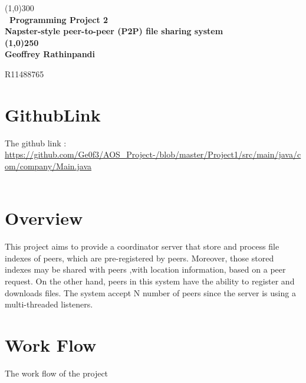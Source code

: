 \documentclass{article}
\begin{document}
\begin{titlepage}
	\begin{center}
	\line(1,0){300}\\
	[0.25in]
	\huge\bfseries\ Programming Project 2 \\Napster-style peer-to-peer (P2P) file sharing system \\
	
	
	\line(1,0){250}\\
	\bfseries {Geoffrey Rathinpandi}\\
	\end{center}
	
	

	\begin{flushright}
	\textsc{R11488765}\\
	
	
	\end{flushright}
	\tableofcontents
\end{titlepage}
\section{GithubLink}
The github link :  \url{https://github.com/Ge0f3/AOS_Project-/blob/master/Project1/src/main/java/com/company/Main.java} \\ \\

\section{Overview}

This project aims to provide a coordinator server that store and process file
indexes of peers, which are pre-registered by peers. Moreover, those stored indexes may be shared with peers ,with location information, based on a peer request. On the other hand, peers in this system have the ability to register and downloads files. The system accept N number of peers since the server is using a multi-threaded listeners.


\section{Work Flow}

The work flow of the project  \\
\end{document}
